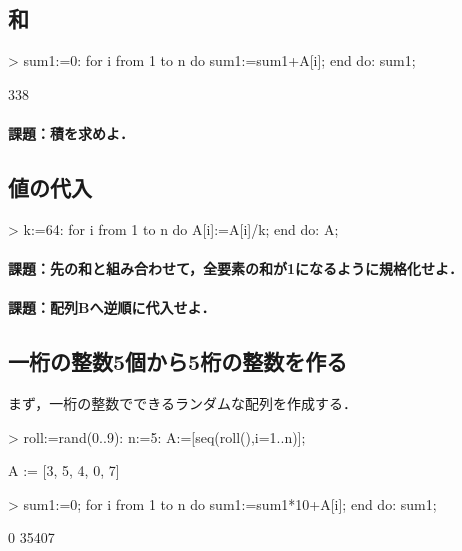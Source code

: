 \subsection{和}
\begin{MapleInput}
> sum1:=0: 
  for i from 1 to n do 
    sum1:=sum1+A[i]; 
  end do: 
  sum1;
\end{MapleInput}
\begin{MapleError}
                                     338
\end{MapleError}
\paragraph{課題：積を求めよ．}
\subsection{値の代入}
\begin{MapleInput}
> k:=64: 
  for i from 1 to n do 
    A[i]:=A[i]/k; 
  end do: 
  A;
\end{MapleInput}
\begin{MapleError}
                        [93/64, 45/64, 3/2, 3/32, 49/32]
\end{MapleError}
\paragraph{課題：先の和と組み合わせて，全要素の和が1になるように規格化せよ．}
\paragraph{課題：配列Bへ逆順に代入せよ．}

\subsection{一桁の整数5個から5桁の整数を作る}
まず，一桁の整数でできるランダムな配列を作成する．
\begin{MapleInput}
> roll:=rand(0..9): n:=5: A:=[seq(roll(),i=1..n)];
\end{MapleInput}
\begin{MapleError}
                            A := [3, 5, 4, 0, 7]
\end{MapleError}
\begin{MapleInput}
> sum1:=0; 
  for i from 1 to n do 
    sum1:=sum1*10+A[i]; 
  end do: 
  sum1;
\end{MapleInput}
\begin{MapleError}
                                      0
                                    35407
\end{MapleError}
